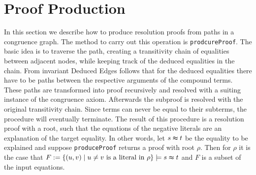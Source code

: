 \section*{Proof Production}
\label{sec:proofproduction}

In this section we describe how to produce resolution proofs from paths in a congruence graph.
The method to carry out this operation is \texttt{prodcureProof}.
The basic idea is to traverse the path, creating a transitivity chain of equalities between adjacent nodes, while keeping track of the deduced equalities in the chain.
From invariant Deduced Edges follows that for the deduced equalities there have to be paths between the respective arguments of the compound terms.
These paths are transformed into proof recursively and resolved with a suiting instance of the congruence axiom.
Afterwards the subproof is resolved with the original transitivity chain.
Since terms can never be equal to their subterms, the procedure will eventually terminate.
The result of this procedure is a resolution proof with a root, such that the equations of the negative literals are an explanation of the target equality.
In other words, let $s \thickapprox t$ be the equality to be explained and suppose \texttt{produceProof} returns a proof with root $\rho$.
Then for $\rho$ it is the case that $F := \{(u,v) \mid u \neq v \text{ is a literal in } \rho\} \models s \thickapprox t$ and $F$ is a subset of the input equations.




